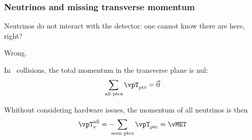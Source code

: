 \begin{frame}
\frametitle{Neutrinos and missing transverse momentum}

\manip Neutrinos do not interact with the detector: one cannot know there are here, right?
\pause
\begin{center}
Wrong.
\end{center}

\manip In \proton\proton\ collisions, the total momentum in the transverse plane is nul:
\begin{equation*}
\sum_\text{all ptcs} \vpT_\text{ptc} = \vec{0}
\end{equation*}

\pause
\manip Whithout considering hardware issues, the momentum of all neutrinos is then
\begin{equation*}
\vpT_\nu^\text{all} = - \!\!\!\! \sum_\text{seen ptcs} \vpT_\text{ptc} = \vMET
\end{equation*}

\end{frame}
